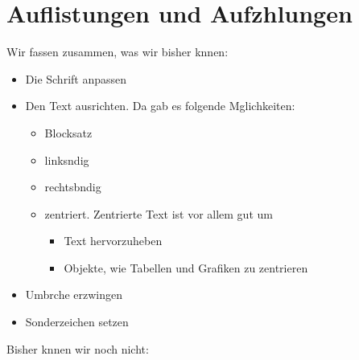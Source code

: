 \documentclass[11pt,a4paper]{article} %
\begin{document}

\section{Auflistungen und Aufzhlungen}
\label{Listen}

Wir fassen zusammen, was wir bisher knnen:

\begin{itemize}
 \item Die Schrift anpassen
 \item Den Text ausrichten. Da gab es folgende Mglichkeiten:
    \begin{itemize}
        \item Blocksatz
        \item linksndig
        \item rechtsbndig
        \item zentriert. Zentrierte Text ist vor allem gut um
            \begin{itemize}
                \item Text hervorzuheben
                \item Objekte, wie Tabellen und Grafiken zu zentrieren
            \end{itemize}
    \end{itemize}
 \item Umbrche erzwingen
 \item Sonderzeichen setzen
\end{itemize}

Bisher knnen wir noch nicht:
\end{document}
